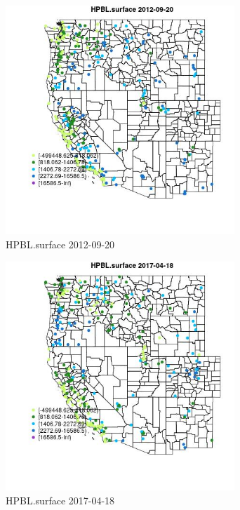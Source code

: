 \begin{figure} 
\centering  
\includegraphics[width=0.77\textwidth]{Code_Outputs/Report_ML_input_PM25_Step4_part_e_de_duplicated_aves_compiled_2019-05-14wNAs_MapObsHPBLsurface2012-09-20.jpg} 
\caption{\label{fig:Report_ML_input_PM25_Step4_part_e_de_duplicated_aves_compiled_2019-05-14wNAsMapObsHPBLsurface2012-09-20}HPBL.surface 2012-09-20} 
\end{figure} 
 

\clearpage 

\begin{figure} 
\centering  
\includegraphics[width=0.77\textwidth]{Code_Outputs/Report_ML_input_PM25_Step4_part_e_de_duplicated_aves_compiled_2019-05-14wNAs_MapObsHPBLsurface2017-04-18.jpg} 
\caption{\label{fig:Report_ML_input_PM25_Step4_part_e_de_duplicated_aves_compiled_2019-05-14wNAsMapObsHPBLsurface2017-04-18}HPBL.surface 2017-04-18} 
\end{figure} 
 

